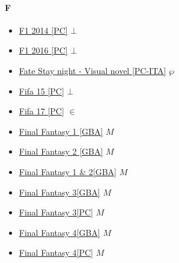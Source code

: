 		\paragraph{F} \hypertarget{GF}{}
			\begin{itemize}
				
				\item \href{https://mega.nz/#!qfJUhDYZ!M6Oi0zl-yV_Nr5wKqGytUPLpAit5tMvBzjAzZVnEvko} {F1 2014 [PC]} $\bot$ \\
				\item \href{https://mega.nz/#!ebQElRYJ!fM4B8F4pu6qMcY_9CqJ-HG8SjUpE-wMP_3FyeIIHnEo} {F1 2016 [PC]} $\bot$ \\
				\item \href{https://mega.nz/#!eWpAWRRR!9fcZMOrpwap4I5eXC3vck_OB0CVojShCLCNj6o4oxdU} {Fate Stay night - Visual novel [PC-ITA]} $\wp$ \\
				\item \href{https://mega.nz/#!nOBXib7Y!rZs2T4X1BchYkkXefjKWgvW6zcB76zdidZ7hwkiNOxo} {Fifa 15 [PC]} $\bot$ \\
				\item \href{https://mega.nz/#!ybIFmaLA!k_Nd5WWzNaKae4UqPzST3Wv5K8lPUBcj34lv7MzZwJQ} {Fifa 17 [PC]} $\in$ \\
				\item \href{https://mega.nz/#!VnATkRwI!VLSmVyotHoB85NzzN7mPNOZn0fNV_XGnnlYazb2VFRY} {Final Fantasy 1 [GBA]} $M$ \\ 
				\item \href{https://mega.nz/#!QjBXiRYQ!un0mRHtrGzjgglrsrIcFVwNXWvmPLEZ7BWKOd1JMy-o} {Final Fantasy 2 [GBA]} $M$ \\ 
				\item \href{https://mega.nz/#!R3Zk2ZyA!BAQRi0I5q-2UwJ02Lu_G9EWL8juXZXlmLKVFxuA4tGM} {Final Fantasy 1 \& 2[GBA]} $M$ \\ 
				\item \href{https://mega.nz/#!xvBlzQqJ!SCd0S3zBHG5-BmM_eB02h19QwjdEAuxC4IwvDTCRdJU} {Final Fantasy 3[GBA]} $M$ \\ 
				\item \href{https://mega.nz/#!4jZUVBYJ!FSt7hBYr_fbON0cj7qK5L6fSbmy8l08L9f1ttVm8oFI} {Final Fantasy 3[PC]} $M$ \\ 
				\item \href{https://mega.nz/#!9jwxQCgB!5KkSnRYitxeXEcPnVNPLNfwyZZSnNjPAy3Ud3ppzk1Y} {Final Fantasy 4[GBA]} $M$ \\ 
				\item \href{https://mega.nz/#!gzJXiLDQ!oW-qLPruNyYZz0tyX9kDKrch1ERsXZP_0b_H333vIVY} {Final Fantasy 4[PC]} $M$ \\ 

\end{itemize}
